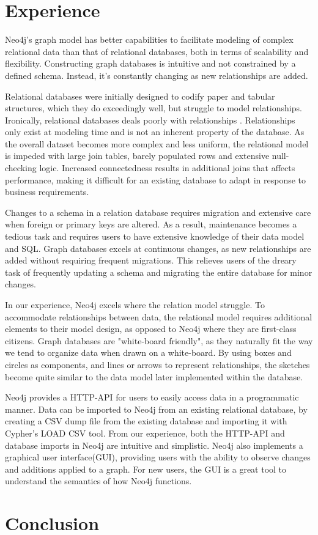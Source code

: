 \documentclass[a4paper, 12pt, conference]{IEEEtran}
\begin{document}
\section{Experience}
Neo4j's graph model has better capabilities to facilitate modeling of complex relational data than that of relational databases, both in terms of 
scalability and flexibility.
Constructing graph databases is intuitive and not constrained by a defined schema.
Instead, it's constantly changing as new relationships are added.

Relational databases were initially designed to codify paper and tabular structures, which they do exceedingly well, but struggle to model relationships.
Ironically, relational databases deals poorly with relationships \cite{graph_book}.
Relationships only exist at modeling time and is not an inherent property of the database.
As the overall dataset becomes more complex and less uniform, the relational model is impeded with large join tables, barely populated rows and extensive null-checking logic. 
Increased connectedness results in additional joins that affects performance, making it difficult for an existing database to adapt in response to business requirements.

Changes to a schema in a relation database requires migration and extensive care when foreign or primary keys are altered.
As a result, maintenance becomes a tedious task and requires users to have extensive knowledge of their data model and SQL.
Graph databases excels at continuous changes, as new relationships are added without requiring frequent migrations.
This relieves users of the dreary task of frequently updating a schema and migrating the entire database for minor changes.

In our experience, Neo4j excels where the relation model struggle. 
To accommodate relationships between data, the relational model requires additional elements to their model design, as opposed to Neo4j where they are first-class citizens.
Graph databases are "white-board friendly", as they naturally fit the way we tend to organize data when drawn on a white-board. By using boxes and circles as components, and lines or arrows to represent relationships, the sketches become quite similar to the data model later implemented within the database.

Neo4j provides a HTTP-API for users to easily access data in a programmatic manner.  
Data can be imported to Neo4j from an existing relational database, by creating a CSV dump file from the existing database and importing it with Cypher's LOAD CSV tool.
From our experience, both the HTTP-API and database imports in Neo4j are intuitive and simplistic.
Neo4j also implements a graphical user interface(GUI), providing users with the ability to observe changes and additions applied to a graph.
For new users, the GUI is a great tool to understand the semantics of how Neo4j functions.
        

\section{Conclusion}



\newpage



\end{document}
